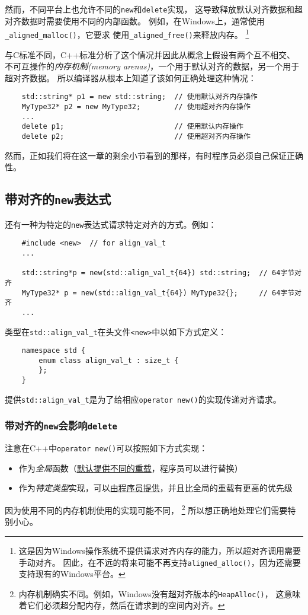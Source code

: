 然而，不同平台上也允许不同的\texttt{new}和\texttt{delete}实现，
这导致释放默认对齐数据和超对齐数据时需要使用不同的内部函数。
例如，在Windows上，通常使用\texttt{\_aligned\_malloc()}，它要求
使用\texttt{\_aligned\_free()}来释放内存。
\footnote{这是因为Windows操作系统不提供请求对齐内存的能力，所以超对齐调用需要手动对齐。
因此，在不远的将来可能不再支持\texttt{aligned\_alloc()}，因为还需要支持现有的Windows平台。}

与C标准不同，C++标准分析了这个情况并因此从概念上假设有两个互不相交、
不可互操作的\emph{内存机制(memory arenas)}，一个用于默认对齐的数据，另一个用于超对齐数据。
所以编译器从根本上知道了该如何正确处理这种情况：
\begin{lstlisting}
    std::string* p1 = new std::string;  // 使用默认对齐内存操作
    MyType32* p2 = new MyType32;        // 使用超对齐内存操作
    ...
    delete p1;                          // 使用默认内存操作
    delete p2;                          // 使用超对齐内存操作
\end{lstlisting}
然而，正如我们将在这一章的剩余小节看到的那样，有时程序员必须自己保证正确性。

\subsection{带对齐的\texttt{new}表达式}\label{ch30.1.2}
还有一种为特定的\texttt{new}表达式请求特定对齐的方式。例如：
\begin{lstlisting}
    #include <new>  // for align_val_t
    ...

    std::string*p = new(std::align_val_t{64}) std::string;  // 64字节对齐
    MyType32* p = new(std::align_val_t{64}) MyType32{};     // 64字节对齐
    ...
\end{lstlisting}
类型在\texttt{std::align\_val\_t}在头文件\texttt{<new>}中以如下方式定义：
\begin{lstlisting}
    namespace std {
        enum class align_val_t : size_t {
        };
    }
\end{lstlisting}
提供\texttt{std::align\_val\_t}是为了给相应\texttt{operator new()}的实现传递对齐请求。

\subsubsection{带对齐的\texttt{new}会影响\texttt{delete}}
注意在C++中\texttt{operator new()}可以按照如下方式实现：
\begin{itemize}
    \item 作为\emph{全局}函数（\hyperref[ch30.3]{默认提供不同的重载}，程序员可以进行替换）
    \item 作为\emph{特定类型}实现，可以\hyperref[ch30.2]{由程序员提供}，并且比全局的重载有更高的优先级
\end{itemize}
因为使用不同的内存机制使用的实现可能不同，
\footnote{内存机制确实不同。例如，Windows没有超对齐版本的\texttt{HeapAlloc()}，
这意味着它们必须超分配内存，然后在请求到的空间内对齐。}
所以想正确地处理它们需要特别小心。

